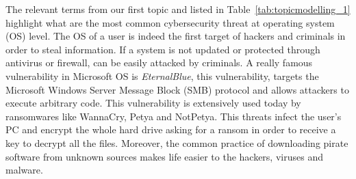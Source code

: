 The relevant terms from our first topic and listed in Table~\ref{tab:topicmodelling_1} highlight what are the most common cybersecurity threat at operating system (OS) level. The OS of a user is indeed the first target of hackers and criminals in order to steal information. If a system is not updated or protected through antivirus or firewall, can be easily attacked by criminals. A really famous vulnerability in Microsoft OS is \textit{EternalBlue}, this vulnerability, targets the Microsoft Windows Server Message Block (SMB) protocol and allows attackers to execute arbitrary code. This vulnerability is extensively used today by ransomwares like WannaCry, Petya and NotPetya. This threats infect the user's PC and encrypt the whole hard drive asking for a ransom in order to receive a key to decrypt all the files. Moreover, the common practice of downloading pirate software from unknown sources makes life easier to the hackers, viruses and malware. 

